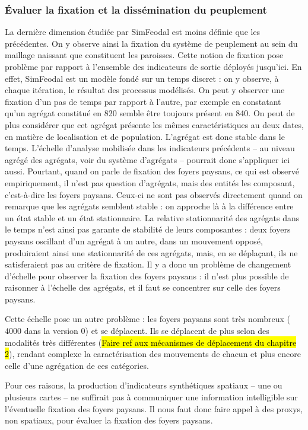 \subsubsection{Évaluer la fixation et la dissémination du peuplement}


La dernière dimension étudiée par SimFeodal est moins définie que les précédentes.
On y observe ainsi la fixation du système de peuplement au sein du maillage naissant que constituent les paroisses.
Cette notion de fixation pose problème par rapport à l'ensemble des indicateurs de sortie déployés jusqu'ici.
En effet, SimFeodal est un modèle fondé sur un temps discret :
on y observe, à chaque itération, le résultat des processus modélisés.
On peut y observer une fixation d'un pas de temps par rapport à l'autre, par exemple en constatant qu'un agrégat constitué en 820 semble être toujours présent en 840.
On peut de plus considérer que cet agrégat présente les mêmes caractéristiques au deux dates, en matière de localisation et de population.
L'agrégat est donc stable dans le temps.
L'échelle d'analyse mobilisée dans les indicateurs précédents -- au niveau agrégé des agrégats, voir du système d'agrégats -- pourrait donc s'appliquer ici aussi.
Pourtant, quand on parle de fixation des foyers paysans, ce qui est observé empiriquement, il n'est pas question d'agrégats, mais des entités les composant, c'est-à-dire les foyers paysans.
Ceux-ci ne sont pas observés directement quand on remarque que les agrégats semblent stable :
on approche là à la différence entre un état stable et un état stationnaire.
La relative stationnarité des agrégats dans le temps n'est ainsi pas garante de stabilité de leurs composantes :
deux foyers paysans oscillant d'un agrégat à un autre, dans un mouvement opposé, produiraient ainsi une stationnarité de ces agrégats, mais, en se déplaçant, ils ne satisferaient pas au critère de fixation.
Il y a donc un problème de changement d'échelle pour observer la fixation des foyers paysans :
il n'est plus possible de raisonner à l'échelle des agrégats, et il faut se concentrer sur celle des foyers paysans.

Cette échelle pose un autre problème :
les foyers paysans sont très nombreux ($4000$ dans la version 0) et se déplacent.
Ils se déplacent de plus selon des modalités très différentes (\hl{Faire ref aux mécanismes de déplacement du chapitre 2}), rendant complexe la caractérisation des mouvements de chacun et plus encore celle d'une agrégation de ces catégories.

Pour ces raisons, la production d'indicateurs synthétiques spatiaux -- une ou plusieurs cartes -- ne suffirait pas à communiquer une information intelligible sur l'éventuelle fixation des foyers paysans.
Il nous faut donc faire appel à des \og proxys\fg{}, non spatiaux, pour évaluer la fixation des foyers paysans.


